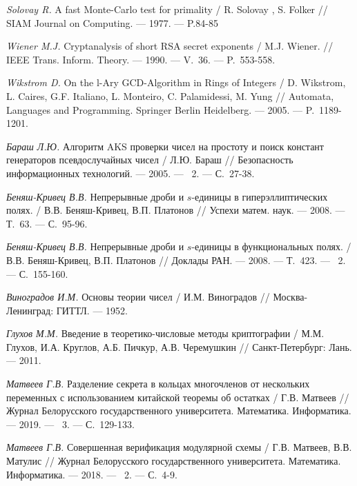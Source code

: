 \begin{thebibliography}{99}
    \textit{Solovay R.} A fast Monte-Carlo test for primality / R. Solovay , S. Folker // SIAM Journal on Computing. --- 1977. --- P.84-85
    
    \textit{Wiener M.J.} Cryptanalysis of short RSA secret exponents / M.J. Wiener. // IEEE Trans. Inform. Theory. --- 1990. --- V.~36. --- P.~553-558.

    \textit{Wikstrom D.} On the l-Ary GCD-Algorithm in Rings of Integers / D. Wikstrom, L. Caires, G.F. Italiano, L. Monteiro, C. Palamidessi, M. Yung // Automata, Languages and Programming. Springer Berlin Heidelberg. --- 2005. --- P.~1189-1201.

    \textit{Бараш Л.Ю.} Алгоритм AKS проверки чисел на простоту и поиск констант генераторов псевдослучайных чисел / Л.Ю. Бараш // Безопасность информационных технологий. --- 2005. --- \textnumero~2. --- С.~27-38.

    \textit{Беняш-Кривец В.В.} Непрерывные дроби и $s$-единицы в гиперэллиптических полях. / В.В. Беняш-Кривец, В.П. Платонов // Успехи матем. наук. --- 2008. --- Т.~63. --- С.~95-96.
    
    \textit{Беняш-Кривец В.В.} Непрерывные дроби и $s$-единицы в функциональных полях. / В.В. Беняш-Кривец, В.П. Платонов // Доклады РАН. --- 2008. --- Т.~423. --- \textnumero~2. --- С.~155-160.

    \textit{Виноградов И.М.} Основы теории чисел / И.М. Виноградов // Москва-Ленинград: ГИТТЛ. --- 1952.

    \textit{Глухов М.М.} Введение в теоретико-числовые методы криптографии / М.М. Глухов, И.А. Круглов, А.Б. Пичкур, А.В. Черемушкин // Санкт-Петербург: Лань. --- 2011.
    
    \textit{Матвеев Г.В.} Разделение секрета в кольцах многочленов от нескольких переменных с использованием китайской теоремы об остатках / Г.В. Матвеев // Журнал Белорусского государственного университета. Математика. Информатика. --- 2019. --- \textnumero~3. --- С.~129-133.
    
    \textit{Матвеев Г.В.} Совершенная верификация модулярной схемы / Г.В. Матвеев, В.В. Матулис // Журнал Белорусского государственного университета. Математика. Информатика. --- 2018. --- \textnumero~2. --- С.~4-9.


\end{thebibliography}
